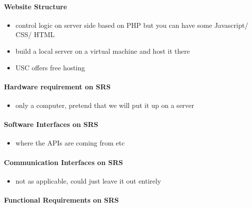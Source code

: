 \documentclass[]{article}
\begin{document}
\paragraph{Website Structure}\label{website-structure}

\begin{itemize}
\itemsep1pt\parskip0pt
\item
  control logic on server side based on PHP but you can have some
  Javascript/ CSS/ HTML
\item
  build a local server on a virtual machine and host it there
\item
  USC offers free hosting
\end{itemize}

\paragraph{Hardware requirement on
SRS}\label{hardware-requirement-on-srs}

\begin{itemize}
\itemsep1pt\parskip0pt
\item
  only a computer, pretend that we will put it up on a server
\end{itemize}

\paragraph{Software Interfaces on SRS}\label{software-interfaces-on-srs}

\begin{itemize}
\itemsep1pt\parskip0pt
\item
  where the APIs are coming from etc
\end{itemize}

\paragraph{Communication Interfaces on
SRS}\label{communication-interfaces-on-srs}

\begin{itemize}
\itemsep1pt\parskip0pt
\item
  not as applicable, could just leave it out entirely
\end{itemize}

\paragraph{Functional Requirements on
SRS}\label{functional-requirements-on-srs}
\end{document}
